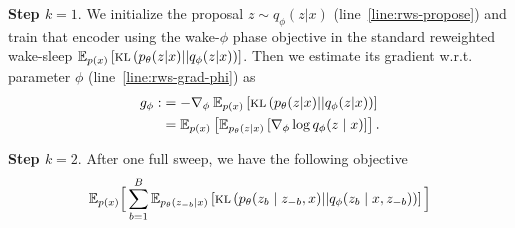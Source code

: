 \documentclass{article}
\theoremstyle{definition}
\newcommand{\given}{\lvert}
\begin{document}
\textbf{Step $k=1$}. We initialize the proposal $z\sim q_\phi(z \given x)$ (line~\ref{line:rws-propose}) and train that encoder using the wake-$\phi$ phase objective in the standard reweighted wake-sleep\cite{le2019revisiting}
$\E_{p(x)}\left[\textsc{kl}\left(p_\theta(z \given x) || q_\phi(z \given x)\right)\right]$. 
Then we estimate its gradient w.r.t. parameter $\phi$ (line~\ref{line:rws-grad-phi}) as
\begin{align}
    \label{eq:g-rws-phi}
    g_\phi :&= - \nabla_\phi \: \E_{p(x)}\left[\textsc{kl}\left(p_\theta(z \given x) || q_\phi(z \given x)\right)\right] \\
    &
    =
    \E_{p(x)}\left[
    \E_{p_\theta(z \given x)}\left[\nabla_\phi \log q_\phi(z \mid x)\right]
    \right]
    . 
\end{align}

\textbf{Step $k=2$}. After one full sweep, we have the following objective
\begin{align*}
    \mathbb{E}_{p(x)}\Big[
    \sum_{b = 1}^B\mathbb{E}_{p_\theta(z_{-b} \mid x)}\left[\textsc{kl}\left(p_\theta(z_b \mid z_{-b}, x) || q_\phi(z_b \mid x, z_{-b})\right)\right]\Big] 
\end{align*}




\end{document}

